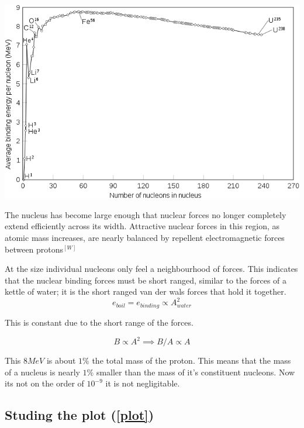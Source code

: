 \documentclass[english, 11pt]{article}
\begin{document}
      \begin{center}\label{plot}
         \includegraphics[scale=0.5 ]{../img/ba}
      \end{center}

      \begin{defn}\label{sat}
        The nucleus has become large enough that nuclear forces no longer completely extend efficiently across its width. Attractive nuclear forces in this region, as atomic mass increases, are nearly balanced by repellent electromagnetic forces between protons$^{[W]}$
      \end{defn}
     
      At the size individual nucleons only feel a neighbourhood of forces. This indicates that the nuclear binding forces must be short ranged, similar to the forces of a kettle of water; it is the short ranged van der wals forces that hold it together. 
      \\ 
      \[ e_{boil} = e_{binding} \propto A^2_{water} \]

      This is constant due to the short range of the forces. 

      \[ B \propto A^2 \implies B/A  \propto A\]

      This $8 MeV$ is about $1\%$ the total mass of the proton. This means that the mass of a nucleus is nearly $1\%$ smaller than the mass of it's constituent nucleons. Now its not on the order of $10^{-9}$ it is not negligitable. 

      \subsection{Studing the plot (\ref{plot})}
\end{document}
